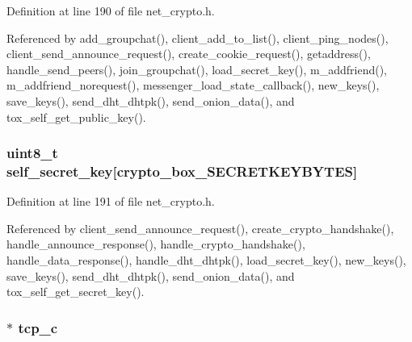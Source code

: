 Definition at line 190 of file net\+\_\+crypto.\+h.



Referenced by add\+\_\+groupchat(), client\+\_\+add\+\_\+to\+\_\+list(), client\+\_\+ping\+\_\+nodes(), client\+\_\+send\+\_\+announce\+\_\+request(), create\+\_\+cookie\+\_\+request(), getaddress(), handle\+\_\+send\+\_\+peers(), join\+\_\+groupchat(), load\+\_\+secret\+\_\+key(), m\+\_\+addfriend(), m\+\_\+addfriend\+\_\+norequest(), messenger\+\_\+load\+\_\+state\+\_\+callback(), new\+\_\+keys(), save\+\_\+keys(), send\+\_\+dht\+\_\+dhtpk(), send\+\_\+onion\+\_\+data(), and tox\+\_\+self\+\_\+get\+\_\+public\+\_\+key().

\hypertarget{struct_net___crypto_aa05050f86513ff53fe9da81f73c72267}{
\subsubsection[{self\+\_\+secret\+\_\+key}]{\setlength{\rightskip}{0pt plus 5cm}uint8\+\_\+t self\+\_\+secret\+\_\+key\mbox{[}crypto\+\_\+box\+\_\+\+S\+E\+C\+R\+E\+T\+K\+E\+Y\+B\+Y\+T\+E\+S\mbox{]}}}\label{struct_net___crypto_aa05050f86513ff53fe9da81f73c72267}


Definition at line 191 of file net\+\_\+crypto.\+h.



Referenced by client\+\_\+send\+\_\+announce\+\_\+request(), create\+\_\+crypto\+\_\+handshake(), handle\+\_\+announce\+\_\+response(), handle\+\_\+crypto\+\_\+handshake(), handle\+\_\+data\+\_\+response(), handle\+\_\+dht\+\_\+dhtpk(), load\+\_\+secret\+\_\+key(), new\+\_\+keys(), save\+\_\+keys(), send\+\_\+dht\+\_\+dhtpk(), send\+\_\+onion\+\_\+data(), and tox\+\_\+self\+\_\+get\+\_\+secret\+\_\+key().

\hypertarget{struct_net___crypto_a179982a02be89eaf6617ed81bd3c0961}{
\subsubsection[{tcp\+\_\+c}]{$\ast$ tcp\+\_\+c}}\label{struct_net___crypto_a179982a02be89eaf6617ed81bd3c0961}


